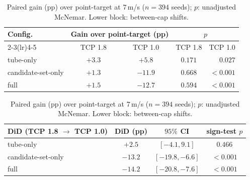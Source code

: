 \begin{table}[t]
\centering
\caption{Paired gain ({\upshape pp}) over point-target at $7$\,{\upshape m/s} ($n{=}394$ seeds); $p$: unadjusted McNemar. Lower block: between-cap shifts.}
\label{tab:limits}
\setlength{\tabcolsep}{3.5pt}
\renewcommand{\arraystretch}{0.92}
\begin{tabular}{lcccr}
\toprule
Config. & \multicolumn{2}{c}{Gain over point-target (pp)} & \multicolumn{2}{c}{$p$} \\
\cmidrule(lr){2-3}\cmidrule(lr){4-5}
 & TCP 1.8 & TCP 1.0 & TCP 1.8 & TCP 1.0 \\
\midrule
tube-only & $+3.3$ & $+5.8$ & $0.171$ & $0.027$ \\
candidate-set-only & $+1.3$ & $-11.9$ & $0.668$ & $<0.001$ \\
full & $+1.5$ & $-12.7$ & $0.594$ & $<0.001$ \\
\bottomrule
\end{tabular}

\begin{tabular}{lccc}
\toprule
DiD (TCP 1.8 $\to$ TCP 1.0) & DiD (pp) & $95\%$ CI & sign-test $p$ \\
\midrule
tube-only & $+2.5$ & $[-4.1,9.1]$ & $0.466$ \\
candidate-set-only & $-13.2$ & $[-19.8,-6.6]$ & $<0.001$ \\
full & $-14.2$ & $[-20.8,-7.6]$ & $<0.001$ \\
\bottomrule
\end{tabular}
\end{table}
